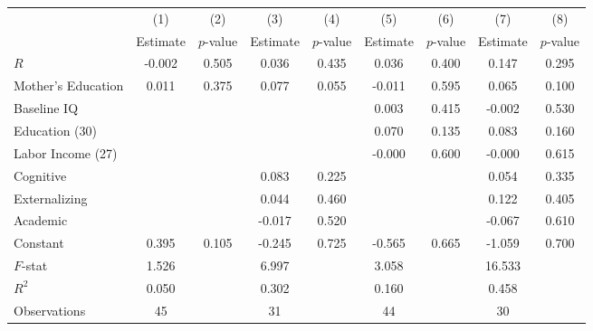 \begin{tabular}{lcccccccc} \toprule
 & (1) & (2) & (3) & (4) & (5) & (6) & (7) & (8) \\ 
 & Estimate  & $p$-value  & Estimate  & $p$-value  & Estimate  & $p$-value  & Estimate  & $p$-value  \\  \midrule
$R$ &    -0.002 &     0.505 &     0.036 &     0.435 &     0.036 &     0.400 &     0.147 &     0.295 \\  
Mother's Education &     0.011 &     0.375 &     0.077 &     0.055 &    -0.011 &     0.595 &     0.065 &     0.100 \\  
Baseline IQ &         &         &         &         &     0.003 &     0.415 &    -0.002 &     0.530 \\  
Education (30) &         &         &         &         &     0.070 &     0.135 &     0.083 &     0.160 \\  
Labor Income (27) &         &         &         &         &    -0.000 &     0.600 &    -0.000 &     0.615 \\  
Cognitive &         &         &     0.083 &     0.225 &         &         &     0.054 &     0.335 \\  
Externalizing &         &         &     0.044 &     0.460 &         &         &     0.122 &     0.405 \\  
Academic &         &         &    -0.017 &     0.520 &         &         &    -0.067 &     0.610 \\  
Constant &     0.395 &     0.105 &    -0.245 &     0.725 &    -0.565 &     0.665 &    -1.059 &     0.700 \\  \midrule
$F$-stat &     1.526 &         &     6.997 &         &     3.058 &         &    16.533 &         \\  
$R^2$ &     0.050 &         &     0.302 &         &     0.160 &         &     0.458 &         \\  
Observations &    45 &         &    31 &         &    44 &         &    30 &         \\  
\bottomrule 
\end{tabular}

